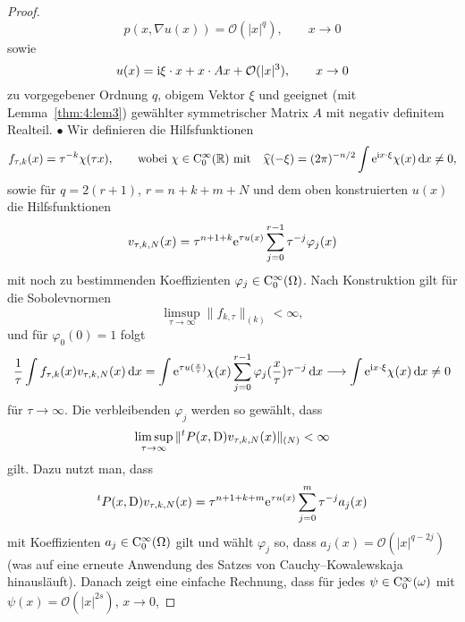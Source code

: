 \begin{proof}
\begin{equation}
    p(x,\nabla u(x)) = \mathcal O(|x|^q),\qquad x\to0
\end{equation}
sowie
\begin{equation}
   u(x) = \mathrm i \xi\cdot x + x\cdot Ax + \mathcal O(|x|^3),\qquad x\to0 
\end{equation}
zu vorgegebener Ordnung $q$, obigem Vektor $\xi$ und geeignet (mit Lemma~\ref{thm:4:lem3}) gewählter symmetrischer Matrix $A$ mit negativ definitem Realteil. 
%
$\bullet$ Wir definieren die Hilfsfunktionen
\begin{equation}
   f_{\tau, k}(x) = \tau^{-k} \chi(\tau x),\qquad \text{wobei $\chi\in\mathrm C_0^\infty(\mathbb R)$ mit}\quad \widehat \chi(-\xi) = (2\pi)^{-n/2}  \int \mathrm e^{\mathrm i x\cdot\xi} \chi(x) \,\mathrm d x \ne 0,
\end{equation}
sowie für $q=2(r+1)$, $r=n+k+m+N$ und dem oben konstruierten $u(x)$ die Hilfsfunktionen
\begin{equation}
   v_{\tau,k,N} (x) = \tau^{n+1+k} \mathrm e^{\tau u(x)} \sum_{j=0}^{r-1} \tau^{-j} \varphi_j(x) 
\end{equation}
mit noch zu bestimmenden Koeffizienten $\varphi_j\in\mathrm C_0^\infty(\Omega)$. Nach Konstruktion gilt für die Sobolevnormen
\begin{equation}\label{eq:cond1}
    \limsup_{\tau\to\infty} \| f_{k,\tau}\|_{(k)} < \infty,
\end{equation}
und für $\varphi_0(0)=1$ folgt
\begin{equation}\label{eq:cond3}
   \frac1\tau \int f_{\tau,k}(x) v_{\tau,k,N}(x)\,\mathrm d x = \int \mathrm e^{\tau u(\frac x\tau)} \chi(x) \sum_{j=0}^{r-1} \varphi_j(\frac x\tau) \tau^{-j} \,\mathrm d x \longrightarrow \int \mathrm e^{\mathrm i x\cdot\xi}\chi(x)\,\mathrm d x\ne0
\end{equation}
für $\tau\to\infty$. Die verbleibenden $\varphi_j$ werden so gewählt, dass 
\begin{equation}\label{eq:cond2}
   \limsup_{\tau\to\infty} \|{}^tP(x,\mathrm D) v_{\tau,k,N}(x)\|_{(N)} <\infty 
\end{equation}
gilt. Dazu nutzt man, dass 
\begin{equation}
{}^tP(x,\mathrm D) v_{\tau,k,N}(x)=\tau^{n+1+k+m}  \mathrm e^{\tau u(x)} \sum_{j=0}^m \tau^{-j} a_j(x) 
\end{equation}
mit Koeffizienten $a_j\in\mathrm C_0^\infty(\Omega)$ gilt und wählt $\varphi_j$ so, dass $a_j(x)=\mathcal O(|x|^{q-2j})$ (was auf eine erneute Anwendung des Satzes von Cauchy--Kowalewskaja hinausläuft). Danach zeigt eine einfache Rechnung, dass für jedes $\psi\in\mathrm C_0^\infty(\omega)$ mit $\psi(x)=\mathcal O(|x|^{2s})$, $x\to0$,

\end{proof}
